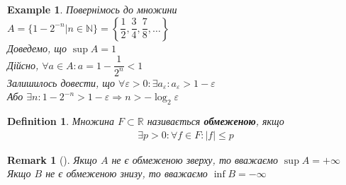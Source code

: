 \documentclass[a4paper, 14pt]{extarticle}
\theoremstyle{theoremdd}
\theoremstyle{theoremdd}
\newtheorem{definition}[theorem]{Definition}
\theoremstyle{theoremdd}
\theoremstyle{theoremdd}
\newtheorem{example}[theorem]{Example}
\theoremstyle{theoremdd}
\theoremstyle{theoremdd}
\newtheorem{remark}[theorem]{Remark}
\theoremstyle{theoremdd}
\theoremstyle{theoremdd}
\begin{document}
	\begin{example} 
	Повернімось до множини \\ $A = \{1-2^{-n} | n \in \mathbb{N}\} = \left\{\dfrac{1}{2}, \dfrac{3}{4}, \dfrac{7}{8}, \dots \right\}$\\
	Доведемо, що $\sup A = 1$\\
	Дійсно, $\forall a \in A: a = 1 - \dfrac{1}{2^n} < 1$\\
	Залишилось довести, що $\forall \varepsilon > 0: \exists a_{\varepsilon}: a_{\varepsilon} > 1 - \varepsilon$\\
	Або $\exists n: 1 - 2^{-n} > 1 -\varepsilon \Rightarrow n > - \log_2 \varepsilon$
	\end{example}
	\begin{definition}
	Множина $F \subset \mathbb{R}$ називається \textbf{обмеженою}, якщо
	\begin{align*}
	\exists p>0: \forall f \in F: |f| \leq p
	\end{align*}
	\end{definition}
	
	\begin{remark}[\hspace{0.1cm}]
	Якщо $A$ не є обмеженою зверху, то вважаємо $\sup A = +\infty$\\
	Якщо $B$ не є обмеженою знизу, то вважаємо $\inf B = -\infty$
	\end{remark}
	
\end{document}
